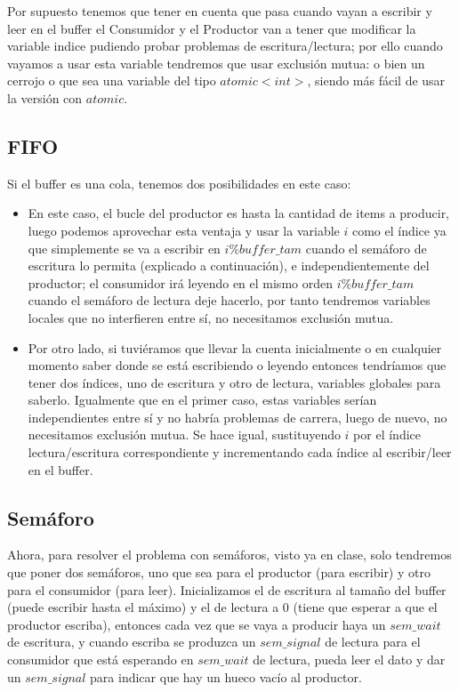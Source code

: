 \documentclass[11pt]{article}
\theoremstyle{ejercicio-style}
\begin{document}
Por supuesto tenemos que tener en cuenta que pasa cuando vayan a escribir y leer en el buffer el Consumidor y el Productor van a tener que modificar la variable indice pudiendo probar problemas de escritura/lectura; por ello cuando vayamos a usar esta variable tendremos que usar exclusión mutua: o bien un cerrojo o que sea una variable del tipo $atomic<int>$, siendo más fácil de usar la versión con $atomic$.

\subsection*{FIFO}
\label{sec::lifo}
Si el buffer es una cola, tenemos dos posibilidades en este caso:
\begin{itemize}
	\item En este caso, el bucle del productor es hasta la cantidad de items a producir, luego podemos aprovechar esta ventaja y usar la variable $i$ como el índice ya que simplemente se va a escribir en $i \% buffer\_tam$ cuando el semáforo de escritura lo permita (explicado a continuación), e independientemente del productor; el consumidor irá leyendo en el mismo orden $i \% buffer\_tam$ cuando el semáforo de lectura deje hacerlo, por tanto tendremos variables locales que no interfieren entre sí, no necesitamos exclusión mutua.

	\item Por otro lado, si tuviéramos que llevar la cuenta inicialmente o en cualquier momento saber donde se está escribiendo o leyendo entonces tendríamos que tener dos índices, uno de escritura y otro de lectura, variables globales para saberlo. Igualmente que en el primer caso, estas variables serían independientes entre sí y no habría problemas de carrera, luego de nuevo, no necesitamos exclusión mutua. Se hace igual, sustituyendo $i$ por el índice lectura/escritura correspondiente y incrementando cada índice al escribir/leer en el buffer.
\end{itemize}

\subsection*{Semáforo}
\label{sec::semaforo}
Ahora, para resolver el problema con semáforos, visto ya en clase, solo tendremos que poner dos semáforos, uno que sea para el productor (para escribir) y otro para el consumidor (para leer). Inicializamos el de escritura al tamaño del buffer (puede escribir hasta el máximo) y el de lectura a 0 (tiene que esperar a que el productor escriba), entonces cada vez que se vaya a producir haya un $sem\_wait$ de escritura, y cuando escriba se produzca un $sem\_signal$ de lectura para el consumidor que está esperando en $sem\_wait$ de lectura, pueda leer el dato y dar un $sem\_signal$ para indicar que hay un hueco vacío al productor. \\
\end{document}
